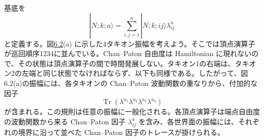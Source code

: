 基底を
\begin{equation}
|N;k;a\rangle=\sum_{i,j=1}^{n}|N;k;ij\rangle\lambda^a_{ij}
\tag{6.5.3}\label{eq:6.5.3}
\end{equation}
と定義する。図\hyperref[fig:6.2]{6.2}(a) に示した4タキオン振幅を考えよう。そこでは頂点演算子が巡回順序1234に並んでいる。Chan--Paton 自由度は Hamiltonian に現れないので、その状態は頂点演算子の間で時間発展しない。タキオン1の右端は、タキオン2の左端と同じ状態でなければならず、以下も同様である。したがって、図6.2(a)の振幅には、各タキオンの Chan--Paton 波動関数の重なりから、付加的な因子
\begin{equation}
\operatorname{Tr}(\lambda^{a_1}\lambda^{a_2}\lambda^{a_3}\lambda^{a_4})
\tag{6.5.4}\label{eq:6.5.4}
\end{equation}
が含まれる。この規則は任意の振幅に一般化される。各頂点演算子は端点自由度の波動関数から来る Chan--Paton 因子 $\lambda^a_{ij}$ を含み、各世界面の振幅には、それぞれの境界に沿って並べた Chan--Paton 因子のトレースが掛けられる。

